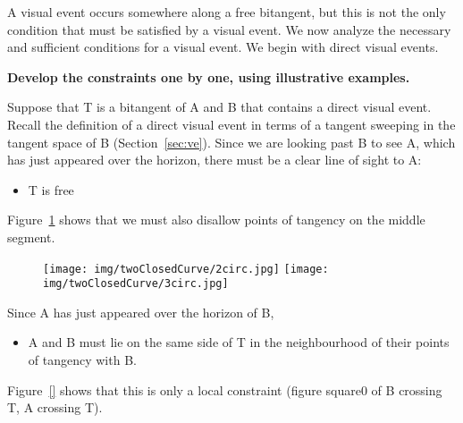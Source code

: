 \documentclass[12pt]{article}
\begin{document}


A visual event occurs somewhere along a free bitangent,
but this is not the only condition that must be satisfied by a visual event.
We now analyze the necessary and sufficient conditions for a visual event.
We begin with direct visual events.

{\bf Develop the constraints one by one, using illustrative examples.}

Suppose that T is a bitangent of A and B that contains a direct visual event.
Recall the definition of a direct visual event in terms of a tangent sweeping 
in the tangent space of B (Section~\ref{sec:ve}).
Since we are looking past B to see A, 
which has just appeared over the horizon,
there must be a clear line of sight to A: 
\begin{itemize}
\item T is free
\end{itemize}
Figure~\ref{fig:free} shows that we must also disallow points of tangency on the middle segment.

\begin{figure}
\begin{center}
\texttt{[image: img/twoClosedCurve/2circ.jpg]}
\texttt{[image: img/twoClosedCurve/3circ.jpg]}
\end{center}
\caption{}
\label{fig:free}
\end{figure}

Since A has just appeared over the horizon of B,
\begin{itemize}
\item A and B must lie on the same side of T in the neighbourhood
of their points of tangency with B.
\end{itemize}
Figure~\ref{} shows that this is only a local constraint 
(figure square0 of B crossing T, A crossing T).
\end{document}
